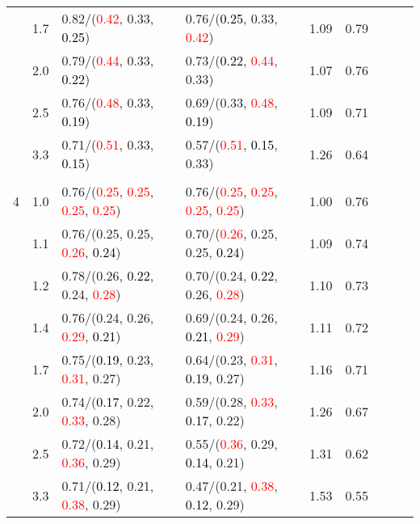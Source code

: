 \documentclass[10pt,a4paper]{report}
\begin{document}
\begin{table}[!htbp]
\begin{center}
{\begin{tabular}{ccllccccc}
			&1.7&0.82/(\textcolor{red}{0.42}, 0.33, \textcolor{black}{0.25})&0.76/(\textcolor{black}{0.25}, 0.33, \textcolor{red}{0.42})&1.09&0.79\\
			&2.0&0.79/(\textcolor{red}{0.44}, 0.33, \textcolor{black}{0.22})&0.73/(\textcolor{black}{0.22}, \textcolor{red}{0.44}, 0.33)&1.07&0.76\\
			&2.5&0.76/(\textcolor{red}{0.48}, 0.33, \textcolor{black}{0.19})&0.69/(0.33, \textcolor{red}{0.48}, \textcolor{black}{0.19})&1.09&0.71\\
			&3.3&0.71/(\textcolor{red}{0.51}, 0.33, \textcolor{black}{0.15})&0.57/(\textcolor{red}{0.51}, \textcolor{black}{0.15}, 0.33)&1.26&0.64\\
			&&&&\\
			4			&1.0&0.76/(\textcolor{red}{0.25}, \textcolor{red}{0.25}, \textcolor{red}{0.25}, \textcolor{red}{0.25})&0.76/(\textcolor{red}{0.25}, \textcolor{red}{0.25}, \textcolor{red}{0.25}, \textcolor{red}{0.25})&1.00&0.76\\
			&1.1&0.76/(0.25, 0.25, \textcolor{red}{0.26}, \textcolor{black}{0.24})&0.70/(\textcolor{red}{0.26}, 0.25, 0.25, \textcolor{black}{0.24})&1.09&0.74\\
			&1.2&0.78/(0.26, \textcolor{black}{0.22}, 0.24, \textcolor{red}{0.28})&0.70/(0.24, \textcolor{black}{0.22}, 0.26, \textcolor{red}{0.28})&1.10&0.73\\
			&1.4&0.76/(0.24, 0.26, \textcolor{red}{0.29}, \textcolor{black}{0.21})&0.69/(0.24, 0.26, \textcolor{black}{0.21}, \textcolor{red}{0.29})&1.11&0.72\\
			&1.7&0.75/(\textcolor{black}{0.19}, 0.23, \textcolor{red}{0.31}, 0.27)&0.64/(0.23, \textcolor{red}{0.31}, \textcolor{black}{0.19}, 0.27)&1.16&0.71\\
			&2.0&0.74/(\textcolor{black}{0.17}, 0.22, \textcolor{red}{0.33}, 0.28)&0.59/(0.28, \textcolor{red}{0.33}, \textcolor{black}{0.17}, 0.22)&1.26&0.67\\
			&2.5&0.72/(\textcolor{black}{0.14}, 0.21, \textcolor{red}{0.36}, 0.29)&0.55/(\textcolor{red}{0.36}, 0.29, \textcolor{black}{0.14}, 0.21)&1.31&0.62\\
			&3.3&0.71/(\textcolor{black}{0.12}, 0.21, \textcolor{red}{0.38}, 0.29)&0.47/(0.21, \textcolor{red}{0.38}, \textcolor{black}{0.12}, 0.29)&1.53&0.55\\
			\bottomrule
		\end{tabular}}
	\end{center}
\end{table}
\end{document}
